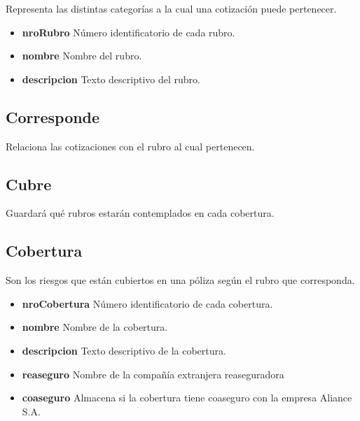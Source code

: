 \documentclass[a4paper,11pt]{article}
\begin{document}
Representa las distintas categorías a la cual una cotización puede pertenecer.

\begin{itemize}
   
  \item \textbf{nroRubro} Número identificatorio de cada rubro.
  
  \item \textbf{nombre} Nombre del rubro.

  \item \textbf{descripcion} Texto descriptivo del rubro.
  
\end{itemize}

\subsection{Corresponde}

Relaciona las cotizaciones con el rubro al cual pertenecen.

\subsection{Cubre}

Guardará qué rubros estarán contemplados en cada cobertura.

\subsection{Cobertura}

Son los riesgos que están cubiertos en una póliza según el rubro que corresponda.

\begin{itemize}
   
  \item \textbf{nroCobertura} Número identificatorio de cada cobertura.
  
  \item \textbf{nombre} Nombre de la cobertura.

  \item \textbf{descripcion} Texto descriptivo de la cobertura.
  
  \item \textbf{reaseguro} Nombre de la compañía extranjera reaseguradora

  \item \textbf{coaseguro} Almacena si la cobertura tiene coaseguro con la empresa Aliance S.A.
  
\end{itemize}
\end{document}
